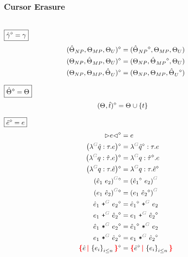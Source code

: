 
\subsubsection{Cursor Erasure}\hspace*{\fill} \\

\noindent $\boxed{\erase{\Z{\gamma}} = \gamma}$
%
\begin{align*}
  \erase{(\Z{\Set}_{NP}, \Set[MP], \Set[U])} &= (\erase{\Z{\Set}_{NP}}, \Set[MP], \Set[U]) \\
  \erase{(\Set[NP], \Z{\Set}_{MP}, \Set[U])} &= (\Set[NP], \erase{\Z{\Set}_{MP}}, \Set[U]) \\
  \erase{(\Set[NP], \Set[MP], \Z{\Set}_U)} &= (\Set[NP], \Set[MP], \erase{\Z{\Set}_U})
\end{align*}

\noindent $\boxed{\erase{\Z{\Set}} = \Set}$
%
\begin{align*}
  \erase{(\Set, \Z{t})} &= \Set \cup \SetOf{t}
\end{align*}

\noindent $\boxed{\erase{\Z{e}} = e}$
%
\begin{align*}
  \erase{\cursor{e}} &= e \\
  \erase{\left(\eFun{G}{\Z{q}}{\tau}{e}\right)} &= \eFun{G}{\erase{\Z{q}}}{\tau}{e} \\
  \erase{\left(\eFun{G}{q}{\Z{\tau}}{e}\right)} &= \eFun{G}{q}{\erase{\Z{\tau}}}{e} \\
  \erase{\left(\eFun{G}{q}{\tau}{\Z{e}}\right)} &= \eFun{G}{q}{\tau}{\erase{\Z{e}}} \\
  \erase{\eApp{G}{\Z{e}_1}{e_2}} &= \eApp{G}{\erase{\Z{e}_1}}{e_2} \\
  \erase{\eApp{G}{e_1}{\Z{e}_2}} &= \eApp{G}{e_1}{\erase{\Z{e}_2}} \\
  \erase{\ePlus{G}{\Z{e}_1}{e_2}} &= \ePlus{G}{\erase{\Z{e}_1}}{e_2} \\
  \erase{\ePlus{G}{e_1}{\Z{e}_2}} &= \ePlus{G}{e_1}{\erase{\Z{e}_2}} \\
  \erase{\eTimes{G}{\Z{e}_1}{e_2}} &= \eTimes{G}{\erase{\Z{e}_1}}{e_2} \\
  \erase{\eTimes{G}{e_1}{\Z{e}_2}} &= \eTimes{G}{e_1}{\erase{\Z{e}_2}} \\
  \erase{\conflictHole{\Z{e}, \SetOf{e_i}_{i \leq n}}} &= \conflictHole{\erase{\Z{e}}, \SetOf{e_i}_{i \leq n}}
\end{align*}

